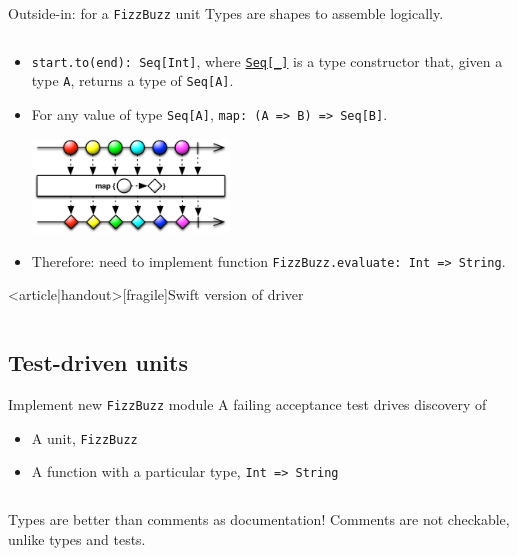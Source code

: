 \begin{frame}[fragile]{Outside-in: for a \texttt{FizzBuzz} unit}
  Types are shapes to assemble logically.

  \inputminted[gobble=2]{scala}{Main4.scala}

  \begin{itemize}
  \item \texttt{start.to(end): Seq[Int]}, where \href{http://www.scala-lang.org/api/2.11.0/index.html\#scala.collection.Seq}{\texttt{Seq[_]}} is a \alert{type constructor} that, given a type \texttt{A}, returns a type of \texttt{Seq[A]}.
  \item For any value of type \texttt{Seq[A]}, \texttt{map: (A => B) => Seq[B]}.
  \begin{center}
    \includegraphics[height=2.5cm]{map.png}
  \end{center}
  \item Therefore: need to implement function \texttt{FizzBuzz.evaluate: Int => String}.
  \end{itemize}
\end{frame}

\begin{frame}<article|handout>[fragile]{Swift version of driver}
  \inputminted{swift}{Main4.swift}
\end{frame}

\subsection{Test-driven units}

\begin{frame}[fragile]{Implement new \texttt{FizzBuzz} module}
  A failing acceptance test drives \alert{discovery} of
  \begin{itemize}
  \item A \alert{unit}, \texttt{FizzBuzz}
  \item A function with a particular type,
    \texttt{Int => String}
  \end{itemize}

  \inputminted{scala}{FizzBuzz1.scala}

  \begin{block}{\alert{Types} are better than \alert{comments} as \alert{documentation}!}
    Comments are not checkable, unlike types and tests.
  \end{block}
\end{frame}

